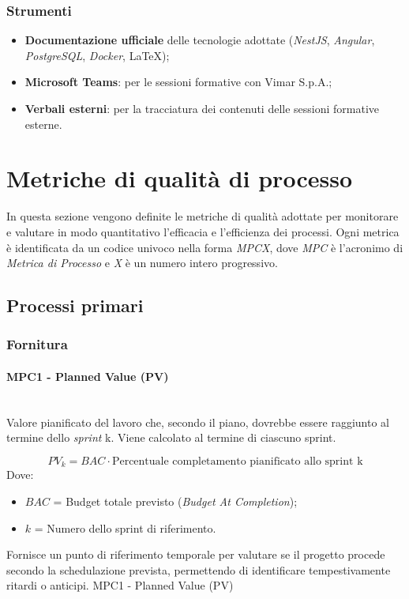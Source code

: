 \documentclass[10pt, letterpaper]{article}
\newcommand{\trisubsection}[1]{\paragraph{#1}\mbox{}\\}
\begin{document}
\subsubsection{Strumenti}
\begin{itemize}
    \item \textbf{Documentazione ufficiale} delle tecnologie adottate (\textit{NestJS}, \textit{Angular}, \textit{PostgreSQL}, \textit{Docker}, \LaTeX);
    \item \textbf{Microsoft Teams}: per le sessioni formative con Vimar S.p.A.;
    \item \textbf{Verbali esterni}: per la tracciatura dei contenuti delle sessioni formative esterne.
\end{itemize}


\section{Metriche di qualità di processo}
\label{sec:MetricheProcesso}
In questa sezione vengono definite le metriche di qualità adottate per monitorare e valutare in modo quantitativo l'efficacia e l'efficienza dei processi.
Ogni metrica è identificata da un codice univoco nella forma \textit{MPCX}, dove \textit{MPC} è l'acronimo di \textit{Metrica di Processo} e \textit{X} è un numero intero progressivo.

\subsection{Processi primari}

\subsubsection{Fornitura}

\trisubsection{MPC1 - Planned Value (PV)}
\label{sec:MPC1}
{Valore pianificato del lavoro che, secondo il piano, dovrebbe essere raggiunto al termine dello \textit{sprint} k. Viene calcolato al termine di ciascuno sprint.}
{\[ PV_k = BAC \cdot \mbox{Percentuale completamento pianificato allo sprint k} \] Dove:
    \begin{itemize}
        \item $BAC$ = Budget totale previsto (\textit{Budget At Completion});
        \item $k$ = Numero dello sprint di riferimento.
    \end{itemize}
}
{Fornisce un punto di riferimento temporale per valutare se il progetto procede secondo la schedulazione prevista, permettendo di identificare tempestivamente ritardi o anticipi.}
{MPC1 - Planned Value (PV)}
\end{document}
